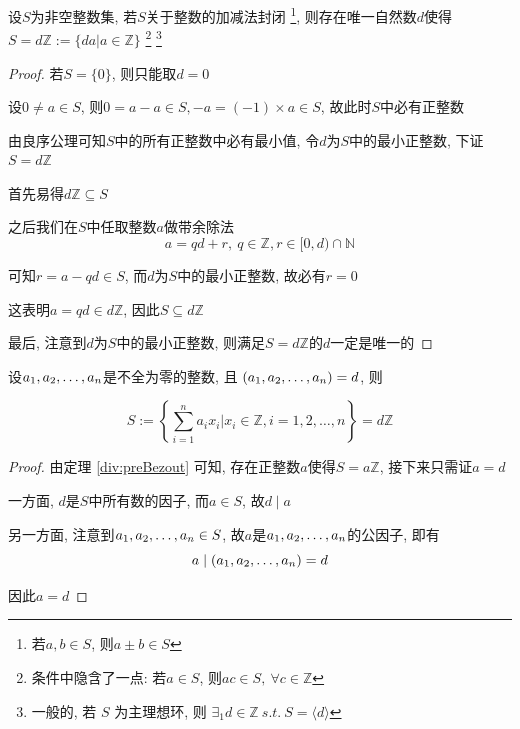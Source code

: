\begin{theorem}
	\label{div:preBezout}
	设\(S\)为非空整数集, 若\(S\)关于整数的加减法封闭 \footnote{若\(a,b\in S\), 则\(a\pm b\in S\)}, 则存在唯一自然数\(d\)使得\(S=d\mathbb{Z}:=\{da|a\in\mathbb{Z}\}\) \footnote{条件中隐含了一点: 若\(a\in S\), 则\(ac\in S,~\forall c\in\mathbb{Z}\)} \footnote{一般的, 若 \(S\) 为主理想环, 则 \(\exists_1 d\in\mathbb{Z}~s.t.~S=\langle d\rangle\)}
	
	\begin{proof}

		若\(S=\{0\}\), 则只能取\(d=0\)
		
		设\(0\ne a\in S\), 则\(0=a-a\in S,-a=(-1)\times a\in S\),
		故此时\(S\)中必有正整数
		
		由良序公理可知\(S\)中的所有正整数中必有最小值,
		令\(d\)为\(S\)中的最小正整数, 下证\(S=d\mathbb{Z}\)
		
		首先易得\(d\mathbb{Z}\subseteq S\)
		
		之后我们在\(S\)中任取整数\(a\)做带余除法
		\begin{equation}
			a=qd+r,~q\in\mathbb{Z},r\in[0,d)\cap\mathbb{N}
		\end{equation}
		
		可知\(r=a-qd\in S\),
		而\(d\)为\(S\)中的最小正整数, 故必有\(r=0\)
		
		这表明\(a=qd\in d\mathbb{Z}\), 因此\(S\subseteq d\mathbb{Z}\)
		
		最后, 注意到\(d\)为\(S\)中的最小正整数,
		则满足\(S=d\mathbb{Z}\)的\(d\)一定是唯一的
		
	\end{proof}
\end{theorem}

\begin{corollary}[B\'{e}zout 定理]
	\label{gcdlcm:bezout}
	设\(\def\enum#1{a_{ #1}}\enum{1},\enum{2},\dots,\enum{n}\)是不全为零的整数, 且
	\((\def\enum#1{a_{ #1}}\enum{1},\enum{2},\dots,\enum{n})=d\), 则
	
	\begin{equation}
		S:=\left\{\sum_{i=1}^na_ix_i\bigg|x_i\in\mathbb{Z},i=1,2,\dots,n\right\}=d\mathbb{Z}
	\end{equation}
	
	\begin{proof}
		由定理 \ref{div:preBezout} 可知, 存在正整数\(a\)使得\(S=a\mathbb{Z}\), 接下来只需证\(a=d\)
		
		一方面, \(d\)是\(S\)中所有数的因子, 而\(a\in S\), 故\(d\mid a\)
		
		另一方面, 注意到\(\def\enum#1{a_{ #1}}\enum{1},\enum{2},\dots,\enum{n}\in S\), 故\(a\)是\(\def\enum#1{a_{ #1}}\enum{1},\enum{2},\dots,\enum{n}\)的公因子, 即有
		\begin{equation}
			a\mid(\def\enum#1{a_{ #1}}\enum{1},\enum{2},\dots,\enum{n})=d
		\end{equation}
		
		因此\(a=d\)
		
	\end{proof}
\end{corollary}
